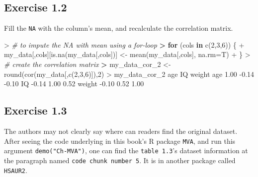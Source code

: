 \documentclass[
]{article}
\newenvironment{Shaded}{\begin{snugshade}}{\end{snugshade}}
\newcommand{\AttributeTok}[1]{\textcolor[rgb]{0.77,0.63,0.00}{#1}}
\newcommand{\CommentTok}[1]{\textcolor[rgb]{0.56,0.35,0.01}{\textit{#1}}}
\newcommand{\ControlFlowTok}[1]{\textcolor[rgb]{0.13,0.29,0.53}{\textbf{#1}}}
\newcommand{\DecValTok}[1]{\textcolor[rgb]{0.00,0.00,0.81}{#1}}
\newcommand{\ErrorTok}[1]{\textcolor[rgb]{0.64,0.00,0.00}{\textbf{#1}}}
\newcommand{\FloatTok}[1]{\textcolor[rgb]{0.00,0.00,0.81}{#1}}
\newcommand{\FunctionTok}[1]{\textcolor[rgb]{0.00,0.00,0.00}{#1}}
\newcommand{\NormalTok}[1]{#1}
\newcommand{\OtherTok}[1]{\textcolor[rgb]{0.56,0.35,0.01}{#1}}
\newcommand{\SpecialCharTok}[1]{\textcolor[rgb]{0.00,0.00,0.00}{#1}}
\begin{document}
\hypertarget{exercise-1.2}{%
\subsection{Exercise 1.2}\label{exercise-1.2}}

Fill the \texttt{NA} with the column's mean, and recalculate the
correlation matrix.

\begin{Shaded}
\begin{Highlighting}[]
\SpecialCharTok{\textgreater{}} \CommentTok{\# to impute the NA with mean using a for{-}loop}
\ErrorTok{\textgreater{}} \ControlFlowTok{for}\NormalTok{ (cols }\ControlFlowTok{in} \FunctionTok{c}\NormalTok{(}\DecValTok{2}\NormalTok{,}\DecValTok{3}\NormalTok{,}\DecValTok{6}\NormalTok{)) \{}
\SpecialCharTok{+}\NormalTok{   my\_data[,cols][}\FunctionTok{is.na}\NormalTok{(my\_data[,cols])] }\OtherTok{\textless{}{-}} \FunctionTok{mean}\NormalTok{(my\_data[,cols], }\AttributeTok{na.rm=}\NormalTok{T)}
\SpecialCharTok{+}\NormalTok{ \}}
\SpecialCharTok{\textgreater{}} \CommentTok{\# create the correlation matrix}
\ErrorTok{\textgreater{}}\NormalTok{ my\_data\_cor\_2 }\OtherTok{\textless{}{-}} \FunctionTok{round}\NormalTok{(}\FunctionTok{cor}\NormalTok{(my\_data[,}\FunctionTok{c}\NormalTok{(}\DecValTok{2}\NormalTok{,}\DecValTok{3}\NormalTok{,}\DecValTok{6}\NormalTok{)]),}\DecValTok{2}\NormalTok{)}
\SpecialCharTok{\textgreater{}}\NormalTok{ my\_data\_cor\_2 }
\NormalTok{         age    IQ weight}
\NormalTok{age     }\FloatTok{1.00} \SpecialCharTok{{-}}\FloatTok{0.14}  \SpecialCharTok{{-}}\FloatTok{0.10}
\NormalTok{IQ     }\SpecialCharTok{{-}}\FloatTok{0.14}  \FloatTok{1.00}   \FloatTok{0.52}
\NormalTok{weight }\SpecialCharTok{{-}}\FloatTok{0.10}  \FloatTok{0.52}   \FloatTok{1.00}
\end{Highlighting}
\end{Shaded}

\hypertarget{exercise-1.3}{%
\subsection{Exercise 1.3}\label{exercise-1.3}}

The authors may not clearly say where can readers find the original
dataset. After seeing the code underlying in this book's R package
\texttt{MVA}, and run this argument \texttt{demo("Ch-MVA")}, one can
find the \texttt{table\ 1.3}'s dataset information at the paragraph
named \texttt{code\ chunk\ number\ 5}. It is in another package called
\texttt{HSAUR2}.
\end{document}
